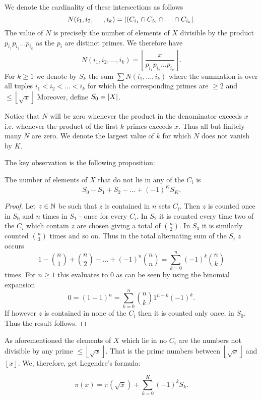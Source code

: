 We denote the cardinality of these intersections as follows
\[
	N(i_1,i_2,\ldots,i_{k}) = \abs{(C_{i_1} \cap C_{i_2} \cap \ldots \cap C_{i_{k}}}
.\] 
The value of $N$ is precisely the number of elements of $X$ divisible by the product $p_{i_1} p_{i_2} \ldots p_{i_{k}}$ 
as the $p_{i}$ are distinct primes. We therefore have
\[
	N(i_1,i_2,\ldots,i_{k}) = \left\lfloor \frac{x}{p_{i_1} p_{i_2} \ldots p_{i_{k}}} \right\rfloor
.\] 
For $k\geq 1$ we denote by $S_{k}$ the sum $\sum N(i_1,\ldots,i_{k}) $ where the summation is over all tuples  $i_1 < i_2 < \ldots <i_{k}$
for which the corresponding primes are $\geq 2$ and $\leq \left\lfloor \sqrt{x}  \right\rfloor$
Moreover, define $S_0 = \abs{X}$.

Notice that $N$ will be zero whenever the product in the denominator exceeds $x$ i.e.
whenever the product of the first $k$ primes exceeds $x$.
Thus all but finitely many $N$ are zero. We denote the largest value of $k$ for which $N$ does not vanish by $K$.

The key observation is the following proposition:
\begin{proposition}
	The number of elements of $X$ that do not lie in any of the $C_{i}$ is
	\[
		S_0 - S_1 + S_2 - \ldots + (-1)^{K} S_{K}
	.\] 
\end{proposition}

\begin{proof}
	Let $z \in \mathbb{N}$ be such that $z$ is contained in $n$ sets $C_{i}$.
	Then $z$ is counted once in $S_0$ and $n$ times in $S_1$ - once for every $C_{i}$.
	In $S_2$ it is counted every time two of the $C_{i}$ which contain $z$ are chosen giving a total of $\binom{n}{2}$.
	In  $S_3$ it is similarly counted $\binom{n}{3}$ times and so on. Thus in the total alternating sum of the $S_{i}$ 
	$z$ occurs
	 \[
		 1 - \binom{n}{1} + \binom{n}{2} - \ldots + (-1)^{n} \binom{n}{n} = \sum_{k=0}^{n} (-1)^{k} \binom{n}{k}
	\] 
	times. For $n \geq 1$ this evaluates to $0$ as can be seen by using the binomial expansion
	\[
		0 = (1 -1)^{n} = \sum_{k=0}^{n} \binom{n}{k} 1^{n-k} (-1)^{k}
	.\] 
	If however $z$ is contained in none of the $C_{i}$ then it is counted only once, in $S_{0}$. Thus the result follows.
\end{proof}

As aforementioned the elements of $X$ which lie in no $C_{i}$ are the numbers not divisible by any prime $\leq \left\lfloor \sqrt{x}  \right\rfloor$.
That is the prime numbers between $\left\lfloor \sqrt{x}  \right\rfloor$ and $\left\lfloor x \right\rfloor$.
We, therefore, get Legendre's formula:
\begin{theorem}
	 \[
		 \pi(x) = \pi(\sqrt{x} ) + \sum_{k=0}^{K} (-1)^{k} S_{k}
	.\] 
\end{theorem}

